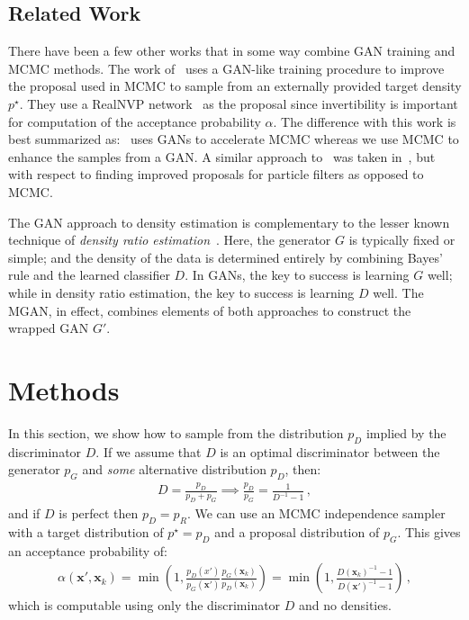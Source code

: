 \documentclass{article}
\renewcommand{\vec}[1]{{\boldsymbol{\mathbf{#1}}}} %
\newcommand{\target}{{p^\star}}
\newcommand{\PG}{{p_G}}
\newcommand{\PD}{{p_D}}
\newcommand{\PR}{{p_R}}
\newcommand{\accept}{\alpha}
\begin{document}
\subsection{Related Work}

There have been a few other works that in some way combine GAN training and MCMC methods.
The work of~\citet{Song2017} uses a GAN-like training procedure to improve the proposal used in MCMC to sample from an externally provided target density $\target$.
They use a RealNVP network~\citep{Dinh2016} as the proposal since invertibility is important for computation of the acceptance probability $\accept$.
The difference with this work is best summarized as:~\citet{Song2017} uses GANs to accelerate MCMC whereas we use MCMC to enhance the samples from a GAN\@.
A similar approach to~\citet{Song2017} was taken in~\citet{Kempinska2017}, but with respect to finding improved proposals for particle filters as opposed to MCMC\@.

The GAN approach to density estimation is complementary to the lesser known technique of \emph{density ratio estimation}~\citep{Sugiyama2012}.
Here, the generator $G$ is typically fixed or simple; and the density of the data is determined entirely by combining Bayes' rule and the learned classifier $D$.
In GANs, the key to success is learning $G$ well; while in density ratio estimation, the key to success is learning $D$ well.
The MGAN, in effect, combines elements of both approaches to construct the wrapped GAN $G'$.

\section{Methods}
\label{sec:Methods}

In this section, we show how to sample from the distribution $\PD$ implied by the discriminator $D$.
If we assume that $D$ is an optimal discriminator between the generator $\PG$ and \emph{some} alternative distribution $\PD$, then:
\begin{align}
  D = \frac{\PD}{\PD + \PG} \implies \frac{\PD}{\PG} = \frac{1}{D^{-1}-1}\,, \label{eq:PD def}
\end{align}
and if $D$ is perfect then $\PD = \PR$.
We can use an MCMC independence sampler with a target distribution of $\target=\PD$ and a proposal distribution of $\PG$.
This gives an acceptance probability of:
\begin{align}
  \accept(\vec x', \vec x_k)
    = \min\left(1, \frac{\PD(x')}{\PG(\vec x')} \frac{\PG(\vec x_k)}{\PD(\vec x_k)}\right)
    = \min\left(1, \frac{D(\vec x_k)^{-1} - 1}{D(\vec x')^{-1} - 1}\right)\,, \label{eq:alpha from D}
\end{align}
which is computable using only the discriminator $D$ and no densities.
\end{document}

